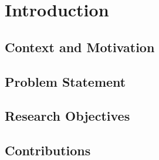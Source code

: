 
%

\chapter{Introduction}
\label{cha:introduction}

\section{Context and Motivation}
\label{sec:context}



\section{Problem Statement}
\label{sec:problem}



\section{Research Objectives}
\label{sec:objectives}



\section{Contributions}
\label{sec:contributions}



